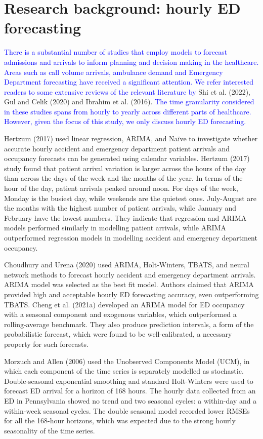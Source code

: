 \documentclass[]{elsarticle} %
\begin{document}
\hypertarget{lit}{%
\section{Research background: hourly ED forecasting}\label{lit}}

\textcolor{blue}{There is a substantial number of studies that employ models to forecast admissions and arrivals to inform planning and decision making in the healthcare. Areas such as call volume arrivals, ambulance demand and Emergency Department forecasting have received a significant attention. We refer interested readers to some extensive reviews of the relevant literature by} Shi et al. (2022), Gul and Celik (2020) and Ibrahim et al. (2016). \textcolor{blue}{The time granularity considered in these studies spans from hourly to yearly across different parts of healthcare. However, given the focus of this study, we only discuss hourly ED forecasting.}

Hertzum (2017) used linear regression, ARIMA, and Naïve to
investigate whether accurate hourly accident and emergency department
patient arrivals and occupancy forecasts can be generated using calendar
variables. Hertzum (2017) study found that patient arrival
variation is larger across the hours of the day than across the days of
the week and the months of the year. In terms of the hour of the day,
patient arrivals peaked around noon. For days of the week, Monday is the
busiest day, while weekends are the quietest ones. July-August are the
months with the highest number of patient arrivals, while January and
February have the lowest numbers. They indicate that regression and
ARIMA models performed similarly in modelling patient arrivals, while
ARIMA outperformed regression models in modelling accident and emergency
department occupancy.

Choudhury and Urena (2020) used ARIMA, Holt-Winters, TBATS, and neural
network methods to forecast hourly accident and emergency department
arrivals. ARIMA model was selected as the best fit model. Authors
claimed that ARIMA provided high and acceptable hourly ED forecasting
accuracy, even outperforming TBATS. Cheng et al. (2021a) developed an ARIMA model
for ED occupancy with a seasonal component and exogenous variables,
which outperformed a rolling-average benchmark. They also produce
prediction intervals, a form of the probabilistic forecast, which were
found to be well-calibrated, a necessary property for such forecasts.

Morzuch and Allen (2006) used the Unobserved Components Model (UCM), in
which each component of the time series is separately modelled as
stochastic. Double-seasonal exponential smoothing and standard
Holt-Winters were used to forecast ED arrival for a horizon of 168
hours. The hourly data collected from an ED in Pennsylvania showed no
trend and two seasonal cycles: a within-day and a within-week seasonal
cycles. The double seasonal model recorded lower RMSEs for all the 168-hour horizons, which was expected due to the strong hourly
seasonality of the time series.
\end{document}
